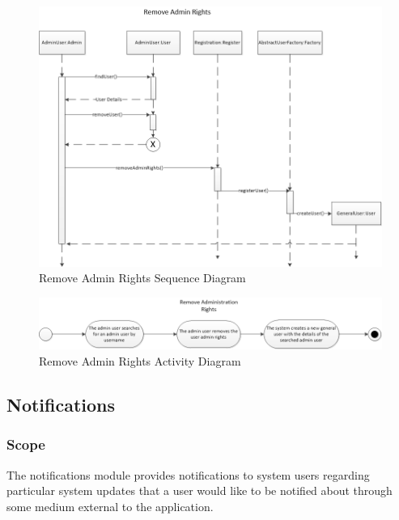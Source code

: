 \documentclass{article}
\begin{document}
    \begin{figure}[h!]
      \includegraphics[width=\textwidth]{User/img/Remove_Admin_Rights_Sequence_Diagram.png}
      \caption{Remove Admin Rights Sequence Diagram}
    \end{figure}
    
    \begin{figure}[h!]
      \includegraphics[width=\textwidth]{User/img/Remove_Admin_Rights_Activity_Diagram.png}
      \caption{Remove Admin Rights Activity Diagram}
    \end{figure}
    
    \clearpage
    
\subsection{Notifications}
\subsubsection{Scope}
 The notifications module provides notifications to system users regarding
    particular system updates that a user would like to be notified about through
    some medium external to the application.
    
\end{document}
